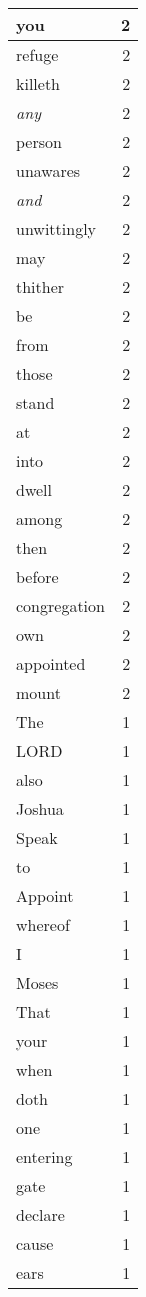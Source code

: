 \begin{center}
\begin{longtable}{l|r}
you & 2\\ \hline 
refuge & 2\\ \hline 
killeth & 2\\ \hline 
\emph{any} & 2\\ \hline 
person & 2\\ \hline 
unawares & 2\\ \hline 
\emph{and} & 2\\ \hline 
unwittingly & 2\\ \hline 
may & 2\\ \hline 
thither & 2\\ \hline 
be & 2\\ \hline 
from & 2\\ \hline 
those & 2\\ \hline 
stand & 2\\ \hline 
at & 2\\ \hline 
into & 2\\ \hline 
dwell & 2\\ \hline 
among & 2\\ \hline 
then & 2\\ \hline 
before & 2\\ \hline 
congregation & 2\\ \hline 
own & 2\\ \hline 
appointed & 2\\ \hline 
mount & 2\\ \hline 
The & 1\\ \hline 
LORD & 1\\ \hline 
also & 1\\ \hline 
Joshua & 1\\ \hline 
Speak & 1\\ \hline 
to & 1\\ \hline 
Appoint & 1\\ \hline 
whereof & 1\\ \hline 
I & 1\\ \hline 
Moses & 1\\ \hline 
That & 1\\ \hline 
your & 1\\ \hline 
when & 1\\ \hline 
doth & 1\\ \hline 
one & 1\\ \hline 
entering & 1\\ \hline 
gate & 1\\ \hline 
declare & 1\\ \hline 
cause & 1\\ \hline 
ears & 1\\ \hline 

\end{longtable}
\end{center}

